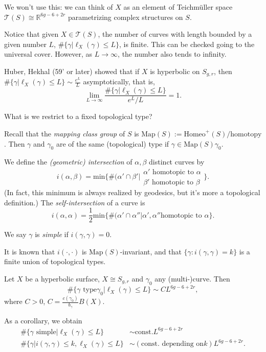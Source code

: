 We won't use this: we can think of $X$ as
an element of Teichmüller space
$\mathcal{T}(S)\cong \mathbb{R}^{6g-6+2r}$
parametrizing complex structures on $S$.

\medskip\noindent
Notice that given $X \in\mathcal{T}(S)$,
the number of curves with length bounded by a
given number $L$,
$\#\{\gamma|\ell_X(\gamma)\leq L\}$,
is finite. This can be checked going to the
universal cover.
However, as $L \to \infty$, the number also
tends to infinity.

Huber, Hekhal (59' or later) showed that if
$X$ is hyperbolic
on $S_{g,r}$, then
$\#\{\gamma|\ell_X(\gamma)\leq L\}\sim
\frac{e^L}{L}$
asymptotically, that is,
$$
\lim_{L\to \infty}\frac{\#
\{\gamma|\ell_X(\gamma)\leq L\}}{e^L/L}=1.
$$

\medskip\noindent
What is we restrict to a fixed topological
type?

Recall that the {\it mapping class group} of
$S$ is
$\text{Map}(S):=\text{Homeo}^+(S)/
\text{homotopy}$.
Then $\gamma$ and $\gamma_0$ are of the same
(topological)
type if $\gamma \in \text{Map}(S)\gamma_0$.

We define the {\it (geometric) intersection}
of $\alpha,\beta$
distinct curves by
$$
i(\alpha,\beta)=\text{min}\{\#(\alpha' \cap
\beta'|
\substack{\alpha'\text{ homotopic to }\alpha
\\
\beta'\text{ homotopic to }\beta}\}.
$$
(In fact, this minimum is always realized by
geodesics,
but it's more a topological definition.)
The {\it self-intersection} of a curve is
$$
i(\alpha,\alpha)=\frac{1}{2}\text{min}
\{\#(\alpha' \cap
\alpha''|\alpha',\alpha''\text{
homotopic to }\alpha\}.
$$

We say $\gamma$ is {\it simple} if
$i(\gamma,\gamma)=0$.

It is known that $i(\cdot,\cdot)$ is
$\text{Map}(S)$-invariant,
and that $\{\gamma:i(\gamma,\gamma)=k\}$ is a
finite union
of topological types.

\begin{theorem}[Mirzakhani, '08, '16]
\label{theorem-mirzakhani}
Let $X$ be a hyperbolic surface, $X \cong
S_{g,r}$
and $\gamma_0$ any (multi-)curve.
Then
$$
\#\{\gamma\text{ type
}\gamma_0|\ell_X(\gamma)\leq L\}
\sim CL^{6g-6+2r},
$$
where $C>0$,
$C=\frac{c(\gamma_0)}{b_\gamma}B(X)$.
\end{theorem}

\noindent
As a corollary, we obtain
$$
\begin{aligned}
\#\{\gamma\text{ simple}|\ell_X(\gamma)\leq
L\}&
\sim\text{const.}L^{6g-6+2r}\\
\#\{\gamma|i(\gamma,\gamma)\leq
k,\ell_X(\gamma)\leq L\}
&\sim (\text{const. depending on
$k$})L^{6g-6+2r}.
\end{aligned}
$$

